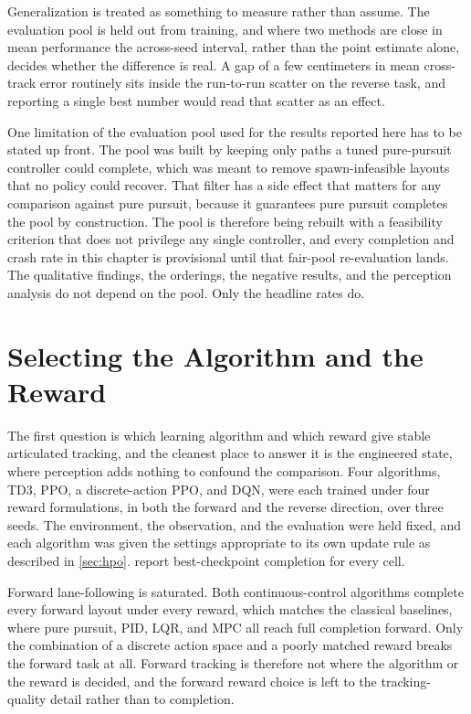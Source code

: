 Generalization is treated as something to measure rather than assume. The evaluation pool is held out from training, and where two methods are close in mean performance the across-seed interval, rather than the point estimate alone, decides whether the difference is real. A gap of a few centimeters in mean cross-track error routinely sits inside the run-to-run scatter on the reverse task, and reporting a single best number would read that scatter as an effect.

One limitation of the evaluation pool used for the results reported here has to be stated up front. The pool was built by keeping only paths a tuned pure-pursuit controller could complete, which was meant to remove spawn-infeasible layouts that no policy could recover. That filter has a side effect that matters for any comparison against pure pursuit, because it guarantees pure pursuit completes the pool by construction. The pool is therefore being rebuilt with a feasibility criterion that does not privilege any single controller, and every completion and crash rate in this chapter is provisional until that fair-pool re-evaluation lands. The qualitative findings, the orderings, the negative results, and the perception analysis do not depend on the pool. Only the headline rates do.

\section{Selecting the Algorithm and the Reward}
\label{sec:algo_reward}

The first question is which learning algorithm and which reward give stable articulated tracking, and the cleanest place to answer it is the engineered state, where perception adds nothing to confound the comparison. Four algorithms, TD3, PPO, a discrete-action PPO, and DQN, were each trained under four reward formulations, in both the forward and the reverse direction, over three seeds. The environment, the observation, and the evaluation were held fixed, and each algorithm was given the settings appropriate to its own update rule as described in \cref{sec:hpo}.  report best-checkpoint completion for every cell.




Forward lane-following is saturated. Both continuous-control algorithms complete every forward layout under every reward, which matches the classical baselines, where pure pursuit, PID, LQR, and MPC all reach full completion forward. Only the combination of a discrete action space and a poorly matched reward breaks the forward task at all. Forward tracking is therefore not where the algorithm or the reward is decided, and the forward reward choice is left to the tracking-quality detail rather than to completion.

